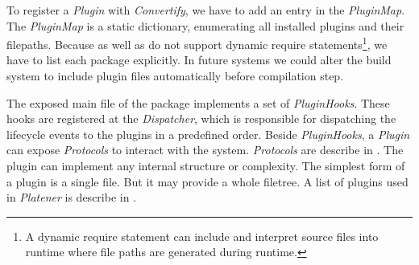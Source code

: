 \documentclass[../ClassicThesis.tex]{subfiles}
\begin{document}
To register a \emph{Plugin} with \emph{Convertify}, we have to add an entry in
the \emph{PluginMap}. The \emph{PluginMap} is a static dictionary, enumerating
all installed plugins and their filepaths. Because \emph{\nodejs} as well as
\emph{\essix} do not support dynamic require statements\footnote{A dynamic
  require statement can include and interpret source files into runtime where
  file paths are generated during runtime.}, we have to list each package
explicitly. In future systems we could alter the build system to include plugin
files automatically before compilation step.

The exposed main file of the package implements a set of \emph{PluginHooks}.
These hooks are registered at the \emph{Dispatcher}, which is responsible for
dispatching the lifecycle events to the plugins in a predefined order. Beside \emph{PluginHooks}, a \emph{Plugin} can expose
\emph{Protocols} to interact with the system. \emph{Protocols} are describe in
. The plugin can implement any internal structure or
complexity. The simplest form of a plugin is a single file. But it may provide a
whole filetree. A list of plugins used in \emph{Platener} is describe in
.






\end{document}
